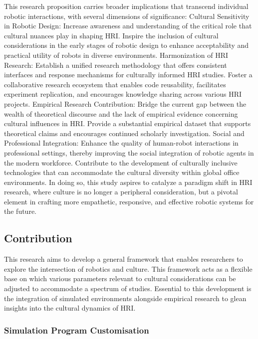 This research proposition carries broader implications that transcend individual robotic interactions, with several dimensions of significance:
Cultural Sensitivity in Robotic Design:
Increase awareness and understanding of the critical role that cultural nuances play in shaping HRI.
Inspire the inclusion of cultural considerations in the early stages of robotic design to enhance acceptability and practical utility of robots in diverse environments.
Harmonization of HRI Research:
Establish a unified research methodology that offers consistent interfaces and response mechanisms for culturally informed HRI studies.
Foster a collaborative research ecosystem that enables code reusability, facilitates experiment replication, and encourages knowledge sharing across various HRI projects.
Empirical Research Contribution:
Bridge the current gap between the wealth of theoretical discourse and the lack of empirical evidence concerning cultural influences in HRI.
Provide a substantial empirical dataset that supports theoretical claims and encourages continued scholarly investigation.
Social and Professional Integration:
Enhance the quality of human-robot interactions in professional settings, thereby improving the social integration of robotic agents in the modern workforce.
Contribute to the development of culturally inclusive technologies that can accommodate the cultural diversity within global office environments.
In doing so, this study aspires to catalyze a paradigm shift in HRI research, where culture is no longer a peripheral consideration, but a pivotal element in crafting more empathetic, responsive, and effective robotic systems for the future.

\subsection{Contribution}

This research aims to develop a general framework that enables researchers to explore the intersection of robotics and culture. This framework acts as a flexible base on which various parameters relevant to cultural considerations can be adjusted to accommodate a spectrum of studies. Essential to this development is the integration of simulated environments alongside empirical research to glean insights into the cultural dynamics of HRI.

\subsubsection{Simulation Program Customisation}

